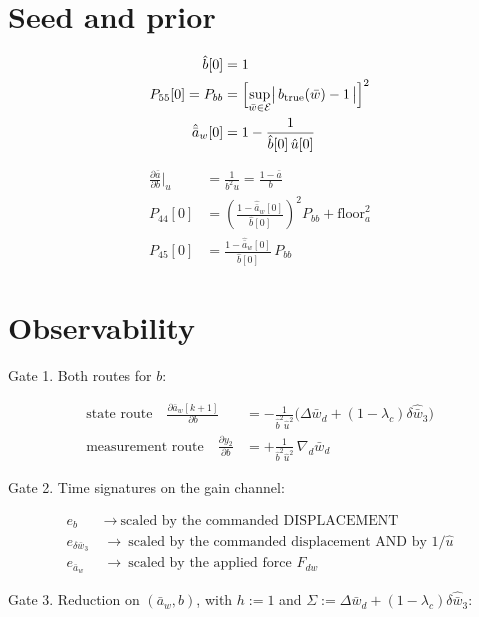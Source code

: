 \documentclass[11pt,a4paper,fontset=none]{ctexart}
\newcommand{\ba}{\bar{a}}
\newcommand{\bw}{\bar{w}}
\begin{document}
\section*{Seed and prior}

\begin{align*}
\hat{b}[0] &= 1 \\
P_{55}[0] = P_{bb} &= \Bigl[\sup_{\bw\in\mathcal{E}}
  \bigl|\,b_{\mathrm{true}}(\bw) - 1\,\bigr|\Bigr]^{2} \\
\hat{\ba}_w[0] &= 1 - \frac{1}{\hat{b}[0]\,\hat{u}[0]}
\end{align*}

\begin{align*}
\frac{\partial \ba}{\partial b}\bigg|_{u}
  &= \frac{1}{b^{2}u} = \frac{1-\ba}{b} \\
P_{44}[0] &= \left(\frac{1-\hat{\ba}_w[0]}{\hat{b}[0]}\right)^{2}P_{bb}
  + \mathrm{floor}_a^{2} \\
P_{45}[0] &= \frac{1-\hat{\ba}_w[0]}{\hat{b}[0]}\,P_{bb}
\end{align*}

\section*{Observability}

Gate 1. Both routes for $b$:

\begin{align*}
\text{state route} \quad
  \frac{\partial \ba_w[k+1]}{\partial b}
    &= -\frac{1}{\hat{b}^{2}\hat{u}^{2}}
       \bigl(\Delta\bw_d + (1-\lambda_c)\delta\hat{\bw}_3\bigr) \\
\text{measurement route} \quad
  \frac{\partial y_2}{\partial b}
    &= +\frac{1}{\hat{b}^{2}\hat{u}^{2}}\,\nabla_d\bw_d
\end{align*}

Gate 2. Time signatures on the gain channel:

\begin{align*}
e_b &\ \longrightarrow\ \text{scaled by the commanded DISPLACEMENT} \\
e_{\delta\bw_3} &\ \longrightarrow\ \text{scaled by the commanded displacement AND by } 1/\hat{u} \\
e_{\ba_w} &\ \longrightarrow\ \text{scaled by the applied force } F_{dw}
\end{align*}

Gate 3. Reduction on $(\ba_w, b)$, with
$h := 1$ and $\Sigma := \Delta\bw_d + (1-\lambda_c)\delta\hat{\bw}_3$:
\end{document}

